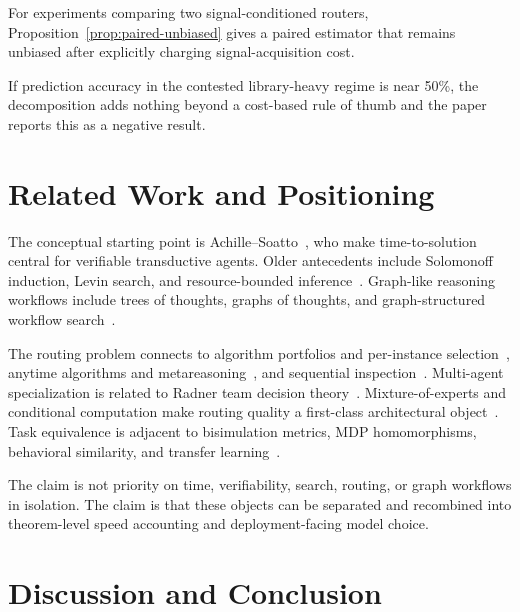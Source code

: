 \documentclass[10pt]{article}
\theoremstyle{paperplain}
\theoremstyle{paperdefinition}
\theoremstyle{paperremark}
\begin{document}
For experiments comparing two signal-conditioned routers, Proposition~\ref{prop:paired-unbiased} gives a paired estimator that remains unbiased after explicitly charging signal-acquisition cost.

If prediction accuracy in the contested library-heavy regime is near 50\%, the decomposition adds nothing beyond a cost-based rule of thumb and the paper reports this as a negative result.

\section{Related Work and Positioning}
\label{sec:related}

The conceptual starting point is Achille--Soatto~\cite{achille2026}, who make time-to-solution central for verifiable transductive agents. Older antecedents include Solomonoff induction, Levin search, and resource-bounded inference~\cite{solomonoff1964,levin1973,livitanyi2008,levin_1984_randomness_conservation,schmidhuber_2002_speed_prior}. Graph-like reasoning workflows include trees of thoughts, graphs of thoughts, and graph-structured workflow search~\cite{yao_2023_tree_of_thoughts,besta_2023_graph_of_thoughts,zhang_2024_aflow}.

The routing problem connects to algorithm portfolios and per-instance selection~\cite{huberman_lukose_hogg_1997_economics_hard,xu_hutter_hoos_leytonbrown_2008_satzilla}, anytime algorithms and metareasoning~\cite{zilberstein_1996_anytime_systems,hansen_2001_monitoring_anytime,russell_wefald_1991_dotherightthing}, and sequential inspection~\cite{weitzman1979,wald1947,chernoff1959}. Multi-agent specialization is related to Radner team decision theory~\cite{radner1962,marschak_radner_1972}. Mixture-of-experts and conditional computation make routing quality a first-class architectural object~\cite{jordan_jacobs_1994_hme,shazeer_2017_moe,fedus_zoph_shazeer_2022_switch}. Task equivalence is adjacent to bisimulation metrics, MDP homomorphisms, behavioral similarity, and transfer learning~\cite{ferns2004,ravindran2003,agarwal2021,taylor2009}.

The claim is not priority on time, verifiability, search, routing, or graph workflows in isolation. The claim is that these objects can be separated and recombined into theorem-level speed accounting and deployment-facing model choice.

\section{Discussion and Conclusion}
\label{sec:discussion}
\end{document}
